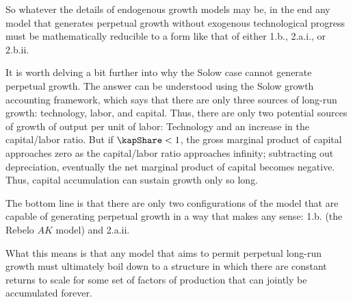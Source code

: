 \documentclass{handout}
\begin{document}
So whatever the details of endogenous growth models may be, in the end
any model that generates perpetual growth without exogenous
technological progress must be mathematically reducible to a form like
that of either 1.b., 2.a.i., or 2.b.ii.

It is worth delving a bit further into why the Solow case cannot 
generate perpetual growth.  The answer can be understood using
the Solow growth accounting framework, which says that there are only three sources
of long-run growth: technology, labor, and capital.  Thus, there are only
two potential sources of growth of output per unit of labor: Technology
and an increase in the capital/labor ratio.  But if $\kapShare < 1$,
the gross marginal product of capital approaches zero as the capital/labor
ratio approaches infinity; subtracting out depreciation, eventually the
net marginal product of capital becomes negative.  Thus, capital accumulation
can sustain growth only so long.

The bottom line is that there are only two configurations of the model
that are capable of generating perpetual growth in a way that makes any
sense: 1.b. (the Rebelo $AK$ model) and 2.a.ii.


What this means is that any model that aims to permit perpetual
long-run growth must ultimately boil down to a structure in which
there are constant returns to scale for some set of factors of
production that can jointly be accumulated forever.


\pagebreak\vfill\eject



\end{document}
